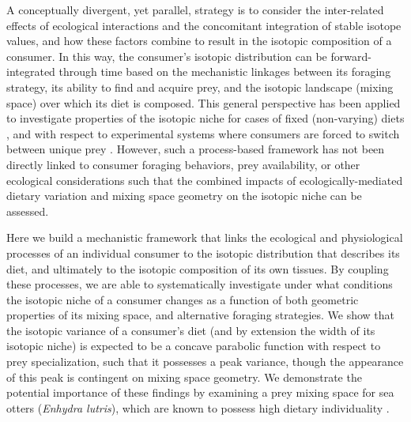 \documentclass{article}
\begin{document}
A conceptually divergent, yet parallel, strategy is to consider the inter-related effects of ecological interactions and the concomitant integration of stable isotope values, and how these factors combine to result in the isotopic composition of a consumer.
In this way, the consumer's isotopic distribution can be forward-integrated through time based on the mechanistic linkages between its foraging strategy, its ability to find and acquire prey, and the isotopic landscape (mixing space) over which its diet is composed.
This general perspective has been applied to investigate properties of the isotopic niche for cases of fixed (non-varying) diets \citep{Araujo:2007iua,Araujo:2009p2286}, and with respect to experimental systems where consumers are forced to switch between unique prey \citep{Fink:2012eg}.
However, such a process-based framework has not been directly linked to consumer foraging behaviors, prey availability, or other ecological considerations such that the combined impacts of ecologically-mediated dietary variation and mixing space geometry on the isotopic niche can be assessed.




Here we build a mechanistic framework that links the ecological and physiological processes of an individual consumer to the isotopic distribution that describes its diet, and ultimately to the isotopic composition of its own tissues.
By coupling these processes, we are able to systematically investigate under what conditions the isotopic niche of a consumer changes as a function of both geometric properties of its mixing space, and alternative foraging strategies.
We show that the isotopic variance of a consumer's diet (and by extension the width of its isotopic niche) is expected to be a concave parabolic function with respect to prey specialization, such that it possesses a peak variance, though the appearance of this peak is contingent on mixing space geometry.
We demonstrate the potential importance of these findings by examining a prey mixing space for sea otters (\emph{Enhydra lutris}), which are known to possess high dietary individuality \citep{Estes:2003uc,Tinker:2008tp,Newsome:2009tn,Newsome:2015gy}.
\end{document}
